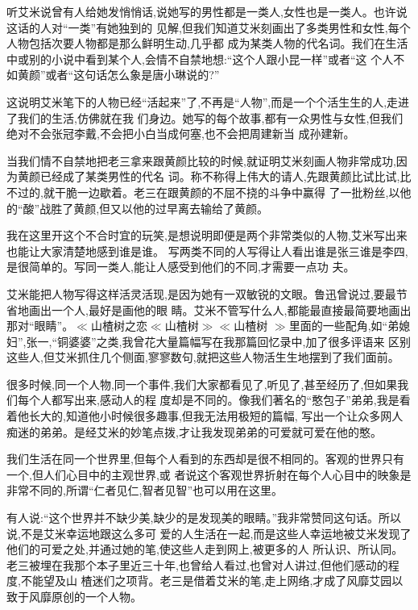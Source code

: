 ﻿\documentclass[12pt]{article}
\begin{document}
听艾米说曾有人给她发悄悄话,说她写的男性都是一类人,女性也是一类人。也许说这话的人对``一类''有她独到的
见解,但我们知道艾米刻画出了多类男性和女性,每个人物\myrule 包括次要人物\myrule 都是那么鲜明生动,几乎都
成为某类人物的代名词。我们在生活中或别的小说中看到某个人,会情不自禁地想:``这个人跟小昆一样''或者``这
个人不如黄颜''或者``这句话怎么象是唐小琳说的?''



这说明艾米笔下的人物已经``活起来''了,不再是``人物'',而是一个个活生生的人,走进了我们的生活,仿佛就在我
们身边。她写的每个故事,都有一众男性与女性,但我们绝对不会张冠李戴,不会把小白当成何塞,也不会把周建新当
成孙建新。



当我们情不自禁地把老三拿来跟黄颜比较的时候,就证明艾米刻画人物非常成功,因为黄颜已经成了某类男性的代名
词。称不称得上伟大的请人,先跟黄颜比试比试,比不过的,就干脆一边歇着。老三在跟黄颜的不屈不挠的斗争中赢得
了一批粉丝,以他的``酸''战胜了黄颜,但又以他的过早离去输给了黄颜。



我在这里开这个不合时宜的玩笑,是想说明即便是两个非常类似的人物,艾米写出来也能让大家清楚地感到谁是谁。
写两类不同的人写得让人看出谁是张三谁是李四,是很简单的。写同一类人,能让人感受到他们的不同,才需要一点功
夫。



艾米能把人物写得这样活灵活现,是因为她有一双敏锐的文眼。鲁迅曾说过,要最节省地画出一个人,最好是画他的眼
睛。艾米不管写什么人,都能最直接最简要地画出那对``眼睛''。$\ll$山楂树之恋$\ll$山楂树$\gg$$\ll$山楂树
$\gg$里面的一些配角,如``弟媳妇'',张一,``铜婆婆''之类,我曾花大量篇幅写在我那篇回忆录中,加了很多评语来
区别这些人,但艾米抓住几个侧面,寥寥数句,就把这些人物活生生地摆到了我们面前。



很多时候,同一个人物,同一个事件,我们大家都看见了,听见了,甚至经历了,但如果我们每个人都写出来,感动人的程
度却是不同的。像我们著名的``憨包子''弟弟,我是看着他长大的,知道他小时候很多趣事,但我无法用极短的篇幅,
写出一个让众多网人痴迷的弟弟。是经艾米的妙笔点拨,才让我发现弟弟的可爱就可爱在他的憨。



我们生活在同一个世界里,但每个人看到的东西却是很不相同的。客观的世界只有一个,但人们心目中的主观世界,或
者说这个客观世界折射在每个人心目中的映象是非常不同的,所谓``仁者见仁,智者见智''也可以用在这里。



有人说:``这个世界并不缺少美,缺少的是发现美的眼睛。''我非常赞同这句话。所以说,不是艾米幸运地跟这么多可
爱的人生活在一起,而是这些人幸运地被艾米发现了他们的可爱之处,并通过她的笔,使这些人走到网上,被更多的人
所认识、所认同。老三被埋在我那个本子里近三十年,也曾给人看过,也曾对人讲过,但他们感动的程度,不能望及山
楂迷们之项背。老三是借着艾米的笔,走上网络,才成了风靡艾园以致于风靡原创的一个人物。
\end{document}
